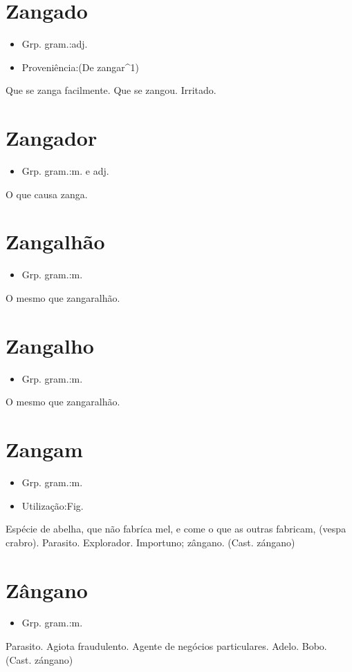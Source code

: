 \section{Zangado}
\begin{itemize}
\item {Grp. gram.:adj.}
\end{itemize}
\begin{itemize}
\item {Proveniência:(De \textunderscore zangar\textunderscore ^1)}
\end{itemize}
Que se zanga facilmente.
Que se zangou.
Irritado.
\section{Zangador}
\begin{itemize}
\item {Grp. gram.:m.  e  adj.}
\end{itemize}
O que causa zanga.
\section{Zangalhão}
\begin{itemize}
\item {Grp. gram.:m.}
\end{itemize}
O mesmo que \textunderscore zangaralhão\textunderscore .
\section{Zangalho}
\begin{itemize}
\item {Grp. gram.:m.}
\end{itemize}
O mesmo que \textunderscore zangaralhão\textunderscore .
\section{Zangam}
\begin{itemize}
\item {Grp. gram.:m.}
\end{itemize}
\begin{itemize}
\item {Utilização:Fig.}
\end{itemize}
Espécie de abelha, que não fabríca mel, e come o que as outras fabricam, (\textunderscore vespa crabro\textunderscore ).
Parasito.
Explorador.
Importuno; zângano.
(Cast. \textunderscore zángano\textunderscore )
\section{Zângano}
\begin{itemize}
\item {Grp. gram.:m.}
\end{itemize}
Parasito.
Agiota fraudulento.
Agente de negócios particulares.
Adelo.
Bobo.
(Cast. \textunderscore zángano\textunderscore )
